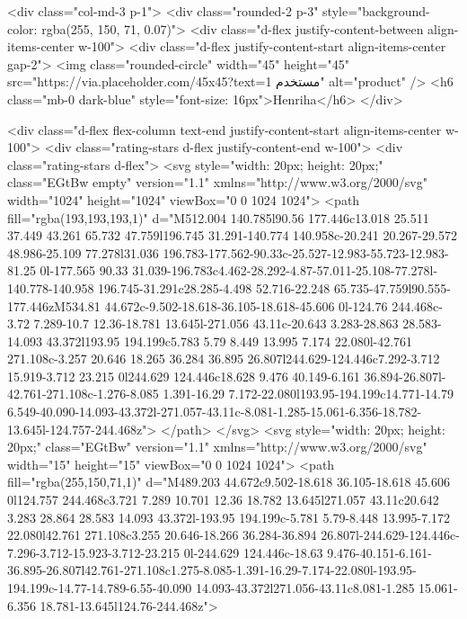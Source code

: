         <div class="col-md-3 p-1">
          <div class="rounded-2 p-3" style="background-color: rgba(255, 150, 71, 0.07)">
            <div class="d-flex justify-content-between align-items-center w-100">
              <div class="d-flex justify-content-start align-items-center gap-2">
                <img class="rounded-circle" width="45" height="45"
                  src="https://via.placeholder.com/45x45?text=مستخدم 1" alt="product" />
                <h6 class="mb-0 dark-blue" style="font-size: 16px">Henriha</h6>
              </div>

              <div class="d-flex flex-column text-end justify-content-start align-items-center w-100">
                <div class="rating-stars d-flex justify-content-end w-100">
                  <div class="rating-stars d-flex">
                    <svg style="width: 20px; height: 20px;" class="EGtBw empty" version="1.1"
                      xmlns="http://www.w3.org/2000/svg" width="1024" height="1024" viewBox="0 0 1024 1024">
                      <path fill="rgba(193,193,193,1)"
                        d="M512.004 140.785l90.56 177.446c13.018 25.511 37.449 43.261 65.732 47.759l196.745 31.291-140.774 140.958c-20.241 20.267-29.572 48.986-25.109 77.278l31.036 196.783-177.562-90.33c-25.527-12.983-55.723-12.983-81.25 0l-177.565 90.33 31.039-196.783c4.462-28.292-4.87-57.011-25.108-77.278l-140.778-140.958 196.745-31.291c28.285-4.498 52.716-22.248 65.735-47.759l90.555-177.446zM534.81 44.672c-9.502-18.618-36.105-18.618-45.606 0l-124.76 244.468c-3.72 7.289-10.7 12.36-18.781 13.645l-271.056 43.11c-20.643 3.283-28.863 28.583-14.093 43.372l193.95 194.199c5.783 5.79 8.449 13.995 7.174 22.080l-42.761 271.108c-3.257 20.646 18.265 36.284 36.895 26.807l244.629-124.446c7.292-3.712 15.919-3.712 23.215 0l244.629 124.446c18.628 9.476 40.149-6.161 36.894-26.807l-42.761-271.108c-1.276-8.085 1.391-16.29 7.172-22.080l193.95-194.199c14.771-14.79 6.549-40.090-14.093-43.372l-271.057-43.11c-8.081-1.285-15.061-6.356-18.782-13.645l-124.757-244.468z">
                      </path>
                    </svg>
                    <svg style="width: 20px; height: 20px;" class="EGtBw" version="1.1"
                      xmlns="http://www.w3.org/2000/svg" width="15" height="15" viewBox="0 0 1024 1024">
                      <path fill="rgba(255,150,71,1)"
                        d="M489.203 44.672c9.502-18.618 36.105-18.618 45.606 0l124.757 244.468c3.721 7.289 10.701 12.36 18.782 13.645l271.057 43.11c20.642 3.283 28.864 28.583 14.093 43.372l-193.95 194.199c-5.781 5.79-8.448 13.995-7.172 22.080l42.761 271.108c3.255 20.646-18.266 36.284-36.894 26.807l-244.629-124.446c-7.296-3.712-15.923-3.712-23.215 0l-244.629 124.446c-18.63 9.476-40.151-6.161-36.895-26.807l42.761-271.108c1.275-8.085-1.391-16.29-7.174-22.080l-193.95-194.199c-14.77-14.789-6.55-40.090 14.093-43.372l271.056-43.11c8.081-1.285 15.061-6.356 18.781-13.645l124.76-244.468z">
